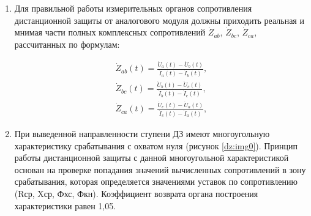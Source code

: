 \begin{enumerate}
\begin{enumerate}
\begin{equation*}
    \dot U_{1M}(t) = \dot U_{1}(t)+0,125 \cdot \dot U_{\textsl{1памяти}} ,
\end{equation*}

и фазы векторов сопротивления, рассчитанные по формулам:

\begin{subequations}\label{eq:group2}
    \begin{align}
        ang \left( \dot Z_{ab}(t) = \frac{\dot U_{1M}(t)\angle{30^\circ} }{\dot I_a(t) - \dot I_b(t)} \right), \\
        ang \left( \dot Z_{bc}(t) = \frac{\dot U_{1M}(t)\angle{-90^\circ} }{\dot I_b(t) - \dot I_c(t)} \right), \\
        ang \left( \dot Z_{ca}(t) = \frac{\dot U_{1M}(t)\angle{120^\circ} }{\dot I_c(t) - \dot I_a(t)} \right),
    \end{align}
\end{subequations}

\item
Для правильной работы измерительных органов сопротивления дистанционной защиты от аналогового модуля должны приходить реальная и мнимая части полных комплексных сопротивлений $\dot Z_{ab}$, $\dot Z_{bc}$, $\dot Z_{ca}$, рассчитанных по формулам:

\vspace{-\abovedisplayskip}
\begin{subequations}\label{eq:group6}
    \begin{align}
        \dot Z_{ab}(t) = \frac{\dot U_{a}(t) - \dot U_{b}(t)}{\dot I_a(t) - \dot I_b(t)},\\
        \dot Z_{bc}(t) = \frac{\dot U_{b}(t) - \dot U_{c}(t)}{\dot I_b(t) - \dot I_c(t)},\\ 
        \dot Z_{ca}(t) = \frac{\dot U_{c}(t) - \dot U_{a}(t)}{\dot I_c(t) - \dot I_a(t)},       
    \end{align}
\end{subequations}

\item
При выведенной направленности ступени ДЗ имеют многоугольную характеристику срабатывания с охватом нуля (рисунок \ref{dz:img0}). Принцип работы дистанционной защиты с данной  многоугольной характеристикой основан на проверке попадания значений вычисленных сопротивлений в зону срабатывания, которая определяется значениями уставок по сопротивлению (Rср, Xср, Фхс, Фкн). Коэффициент возврата органа построения характеристики равен 1,05. 


\end{enumerate}
\end{enumerate}
